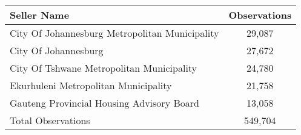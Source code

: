 \begin{tabu}{lc}
\toprule
 Seller Name & Observations \\
\midrule
City Of Johannesburg Metropolitan Municipality & 29,087  \\
City Of Johannesburg & 27,672  \\
City Of Tshwane Metropolitan Municipality & 24,780  \\
Ekurhuleni Metropolitan Municipality & 21,758  \\
Gauteng Provincial Housing Advisory Board & 13,058  \\
\midrule
Total Observations & 549,704  \\
\bottomrule
\end{tabu}
